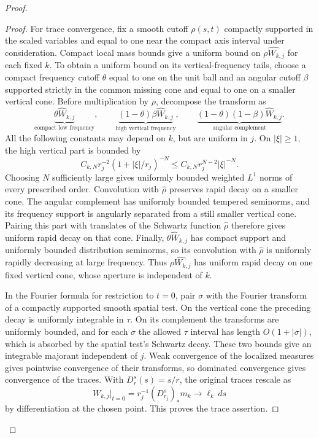 \documentclass[11pt]{article}
\begin{document}
\begin{proof}
\begin{proof}
For trace convergence, fix a smooth cutoff $\rho(s,t)$ compactly supported in the scaled variables and equal to one near the compact axis interval under consideration. Compact local mass bounds give a uniform bound on $\widehat{\rho W_{k,j}}$ for each fixed $k$. To obtain a uniform bound on its vertical-frequency tails, choose a compact frequency cutoff $\theta$ equal to one on the unit ball and an angular cutoff $\beta$ supported strictly in the common missing cone and equal to one on a smaller vertical cone. Before multiplication by $\rho$, decompose the transform as
\[
 \underbrace{\theta\widehat W_{k,j}}_{\text{compact low frequency}},
 \qquad
 \underbrace{(1-\theta)\beta\widehat W_{k,j}}_{\text{high vertical frequency}},
 \qquad
 \underbrace{(1-\theta)(1-\beta)\widehat W_{k,j}}_{\text{angular complement}}.
\]
All the following constants may depend on $k$, but are uniform in $j$. On $|\xi|\ge1$, the high vertical part is bounded by
\[
 C_{k,N}r_j^{-2}(1+|\xi|/r_j)^{-N}
 \le C_{k,N}r_j^{N-2}|\xi|^{-N}.
\]
Choosing $N$ sufficiently large gives uniformly bounded weighted $L^1$ norms of every prescribed order. Convolution with $\widehat\rho$ preserves rapid decay on a smaller cone. The angular complement has uniformly bounded tempered seminorms, and its frequency support is angularly separated from a still smaller vertical cone. Pairing this part with translates of the Schwartz function $\widehat\rho$ therefore gives uniform rapid decay on that cone. Finally, $\theta\widehat W_{k,j}$ has compact support and uniformly bounded distribution seminorms, so its convolution with $\widehat\rho$ is uniformly rapidly decreasing at large frequency. Thus $\widehat{\rho W_{k,j}}$ has uniform rapid decay on one fixed vertical cone, whose aperture is independent of $k$.

In the Fourier formula for restriction to $t=0$, pair $\sigma$ with the Fourier transform of a compactly supported smooth spatial test. On the vertical cone the preceding decay is uniformly integrable in $\tau$. On its complement the transforms are uniformly bounded, and for each $\sigma$ the allowed $\tau$ interval has length $O(1+|\sigma|)$, which is absorbed by the spatial test's Schwartz decay. These two bounds give an integrable majorant independent of $j$. Weak convergence of the localized measures gives pointwise convergence of their transforms, so dominated convergence gives convergence of the traces. With $D_r^s(s)=s/r$, the original traces rescale as
\[
 W_{k,j}|_{t=0}=r_j^{-1}(D_{r_j}^s)_*m_k
 \longrightarrow \ell_k\,ds
\]
by differentiation at the chosen point. This proves the trace assertion.


\end{proof}
\end{proof}
\end{document}
